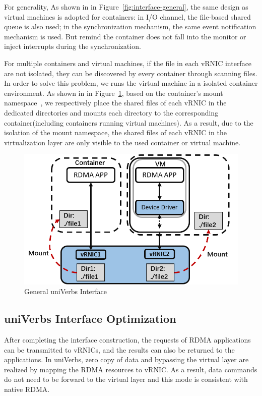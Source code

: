  For generality, As shown in in Figure~\ref{fig:interface-general}, the same design as virtual machines is adopted for containers: in I/O channel, the file-based shared queue is also used; in the synchronization mechanism, the same event notification mechanism is used. But remind the container does not fall into the monitor or inject interrupts during the synchronization.

For multiple containers and virtual machines, if the file in each vRNIC interface are not isolated, they can be discovered by every container through scanning files. In order to solve this problem, we runs the virtual machine in a isolated container environment. As shown in in Figure~\ref{fig:interface-isolate}, based on the container's mount namespace~\cite{mount-ns}, we respectively place the shared files of each vRNIC in the dedicated directories and mounts each directory to the corresponding container(including containers running virtual machines). As a result, due to the isolation of the mount namespace, the shared files of each vRNIC in the virtualization layer are only visible to the used container or virtual machine.  

\begin{figure}[!ht]
	\centering
	\includegraphics[width=1.0\linewidth]{images/interface-isolate}
	\caption{General uniVerbs Interface}
	\label{fig:interface-isolate}
\end{figure}

\subsection{uniVerbs Interface Optimization}
After completing the interface construction, the requests of RDMA applications can be transmitted to vRNICs, and the results can also be returned to the applications. In uniVerbs, zero copy of data and bypassing the virtual layer are realized by mapping the RDMA resources to vRNIC. As a result, data commands do not need to be forward to the virtual layer and this mode is consistent with native RDMA.

